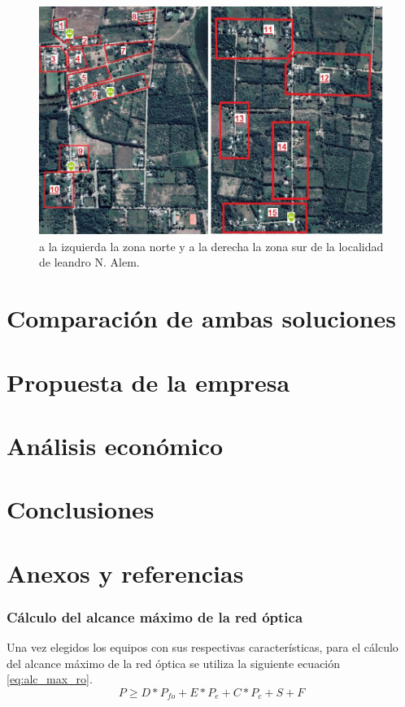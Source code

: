 \documentclass[11pt,a4paper]{article}
\begin{document}
\begin{figure}[htbp]
  \centering
  \includegraphics[width=0.8\linewidth]{fotos_ema/cuadrantes_alem.jpg}
  \caption{a la izquierda la zona norte y a la derecha la zona sur de la localidad de leandro N. Alem.}
  \label{fig:cuadrantes_alem_fo}
\end{figure}



\part{Comparación de ambas soluciones}


\part{Propuesta de la empresa}

\part{Análisis económico}

\part{Conclusiones}

\part{Anexos y referencias}

\section{Cálculo del alcance máximo de la red óptica}
\label{section:calculo_alc_max_fo}
Una vez elegidos los equipos con sus respectivas características, para el cálculo del alcance máximo de la red óptica se utiliza la siguiente ecuación \ref{eq:alc_max_ro}. 
\begin{equation}
  P \geq D*P_{fo}+E*P_e+C*P_c+S+F
  \label{eq:alc_max_ro} 
\end{equation}
\end{document}
